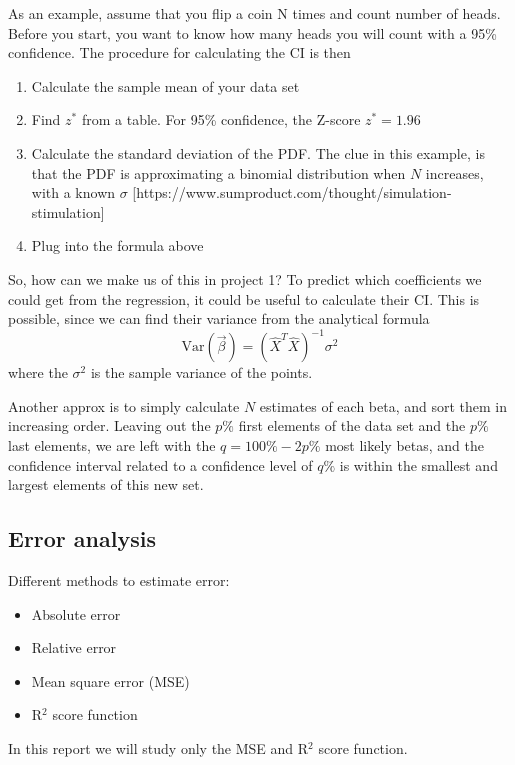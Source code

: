 As an example, assume that you flip a coin N times and count number of heads. Before you start, you want to know how many heads you will count with a 95\% confidence. The procedure for calculating the CI is then
\begin{enumerate}
	\item Calculate the sample mean of your data set
	\item Find $z^*$ from a table. For 95\% confidence, the Z-score $z^*=1.96$
	\item Calculate the standard deviation of the PDF. The clue in this example, is that the PDF is approximating a binomial distribution when $N$ increases, with a known $\sigma$ [https://www.sumproduct.com/thought/simulation-stimulation] 
	\item Plug into the formula above
\end{enumerate}

So, how can we make us of this in project 1? To predict which coefficients we could get from the regression, it could be useful to calculate their CI. This is possible, since we can find their variance from the analytical formula
\begin{equation}
\text{Var}(\vec{\beta})=(\hat{X}^T\hat{X})^{-1}\sigma^2
\end{equation}
where the $\sigma^2$ is the sample variance of the points.

Another approx is to simply calculate $N$ estimates of each beta, and sort them in increasing order. Leaving out the $p\%$ first elements of the data set and the $p\%$ last elements, we are left with the $q=100\%-2p\%$ most likely betas, and the confidence interval related to a confidence level of $q\%$ is within the smallest and largest elements of this new set.

\subsection{Error analysis} \label{sec:error_analysis}
Different methods to estimate error:
\begin{itemize}
	\item{Absolute error}
	\item{Relative error}
	\item{Mean square error (MSE)}
	\item{R$^2$ score function}
\end{itemize}
In this report we will study only the MSE and R$^2$ score function.

